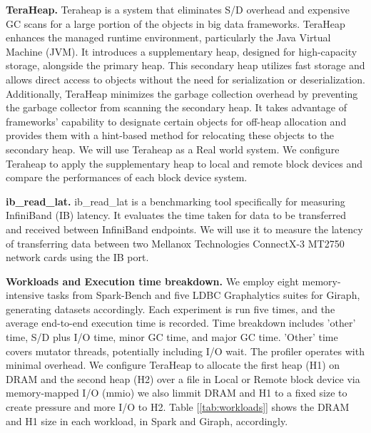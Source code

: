 \par\textbf{TeraHeap.} Teraheap is a system that eliminates S/D overhead and expensive GC scans for a
large portion of the objects in big data frameworks. TeraHeap enhances the
managed runtime environment, particularly the Java Virtual Machine (JVM). It
introduces a supplementary heap, designed for high-capacity storage, alongside
the primary heap. This secondary heap utilizes fast storage and allows direct
access to objects without the need for serialization or deserialization.
Additionally, TeraHeap minimizes the garbage collection overhead by preventing
the garbage collector from scanning the secondary heap. It takes advantage of
frameworks' capability to designate certain objects for off-heap allocation and
provides them with a hint-based method for relocating these objects to the
secondary heap. We will use Teraheap as a Real world system. We configure Teraheap to apply the supplementary heap to local and remote block devices and compare the performances of each block device system.
\par\textbf{ib\_read\_lat.} ib\_read\_lat is a benchmarking tool specifically for measuring InfiniBand (IB) latency. It evaluates the time taken for data to be transferred and received between InfiniBand endpoints. We will use it to measure the latency of transferring data between two Mellanox Technologies ConnectX-3 MT2750 network cards using the IB port.
\par\textbf{Workloads and Execution time breakdown.} We employ eight memory-intensive tasks from Spark-Bench and five LDBC Graphalytics suites for Giraph, generating datasets accordingly. Each experiment is run five times, and the average end-to-end execution time is recorded. Time breakdown includes 'other' time, S/D plus I/O time, minor GC time, and major GC time. 'Other' time covers mutator threads, potentially including I/O wait. The profiler operates with minimal overhead. We configure TeraHeap to allocate the first heap (H1) on DRAM and the second heap (H2) over a file in Local or Remote block device via memory-mapped I/O (mmio) we also limmit DRAM and H1 to a fixed size to create pressure and more I/O to H2. Table [\ref{tab:workloads}] shows the DRAM and H1 size in each workload, in Spark and Giraph, accordingly.
